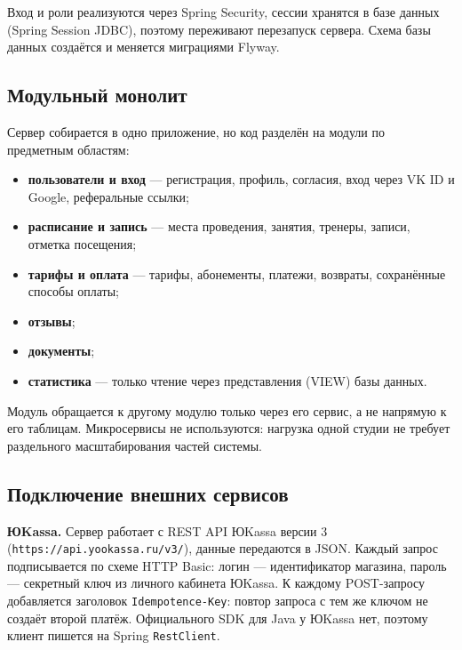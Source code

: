 \documentclass[14pt,a4paper]{extarticle}
\begin{document}
Вход и роли реализуются через Spring Security, сессии хранятся в базе данных (Spring Session JDBC), поэтому переживают перезапуск сервера. Схема базы данных создаётся и меняется миграциями Flyway.

\subsection{Модульный монолит}

Сервер собирается в одно приложение, но код разделён на модули по предметным областям:
\begin{itemize}
  \item \textbf{пользователи и вход} --- регистрация, профиль, согласия, вход через VK ID и Google, реферальные ссылки;
  \item \textbf{расписание и запись} --- места проведения, занятия, тренеры, записи, отметка посещения;
  \item \textbf{тарифы и оплата} --- тарифы, абонементы, платежи, возвраты, сохранённые способы оплаты;
  \item \textbf{отзывы};
  \item \textbf{документы};
  \item \textbf{статистика} --- только чтение через представления (VIEW) базы данных.
\end{itemize}

Модуль обращается к другому модулю только через его сервис, а не напрямую к его таблицам. Микросервисы не используются: нагрузка одной студии не требует раздельного масштабирования частей системы.

\subsection{Подключение внешних сервисов}

\textbf{ЮKassa.} Сервер работает с REST API ЮKassa версии 3 (\texttt{https://api.yookassa.ru/v3/}), данные передаются в JSON. Каждый запрос подписывается по схеме HTTP Basic: логин --- идентификатор магазина, пароль --- секретный ключ из личного кабинета ЮKassa. К каждому POST-запросу добавляется заголовок \texttt{Idempotence-Key}: повтор запроса с тем же ключом не создаёт второй платёж. Официального SDK для Java у ЮKassa нет, поэтому клиент пишется на Spring \texttt{RestClient}.
\end{document}

